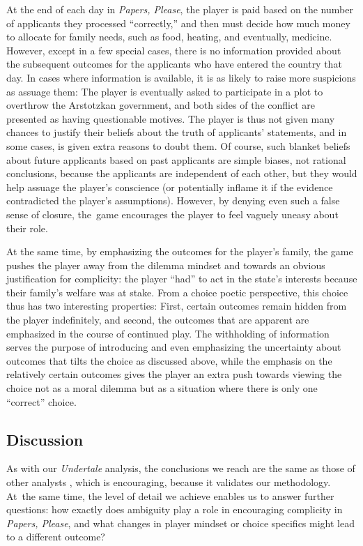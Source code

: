 \documentclass[arts,article,accept,moreauthors,pdftex,10pt,a4paper]{Definitions/mdpi}
\begin{document}
At the end of each day in \emph{Papers, Please}, the player is paid based on the number of applicants they processed ``correctly,'' and then must decide how much money to allocate for family needs, such as food, heating, and eventually, medicine.
%
However, except in a few special cases, there is no information provided about the subsequent outcomes for the applicants who have entered the country that day.
%
In cases where information is available, it is as likely to raise more suspicions as assuage them: The player is eventually asked to participate in a plot to overthrow the Arstotzkan government, and both sides of the conflict are presented as having questionable motives.
%
The player is thus not given many chances to justify their beliefs about the truth of applicants' statements, and in some cases, is given extra reasons to doubt them.
%
Of course, such blanket beliefs about future applicants based on past applicants are simple biases, not rational conclusions, because the applicants are independent of each other, but they would help assuage the player's conscience (or potentially inflame it if the evidence contradicted the player's assumptions).
%
However, by denying even such a false sense of closure, the~game encourages the player to feel vaguely uneasy about their role.



At the same time, by emphasizing the outcomes for the player's family, the game pushes the player away from the dilemma mindset and towards an obvious justification for complicity: the player ``had'' to act in the state's interests because their family's welfare was at stake.
%
From a choice poetic perspective, this choice thus has two interesting properties: First, certain outcomes remain hidden from the player indefinitely, and second, the outcomes that are apparent are emphasized in the course of continued play.
%
The withholding of information serves the purpose of introducing and even emphasizing the uncertainty about outcomes that tilts the choice as discussed above, while the emphasis on the relatively certain outcomes gives the player an extra push towards viewing the choice not as a moral dilemma but as a situation where there is only one ``correct'' choice.

\subsection{Discussion}

As with our \emph{Undertale} analysis, the conclusions we reach are the same as those of other analysts \citep{alexander2013designing,formosa2016papers}, which is encouraging, because it validates our methodology.
%
At~the same time, the level of detail we achieve enables us to answer further questions: how exactly does ambiguity play a role in encouraging complicity in \emph{Papers, Please}, and what changes in player mindset or choice specifics might lead to a different outcome?
\end{document}
